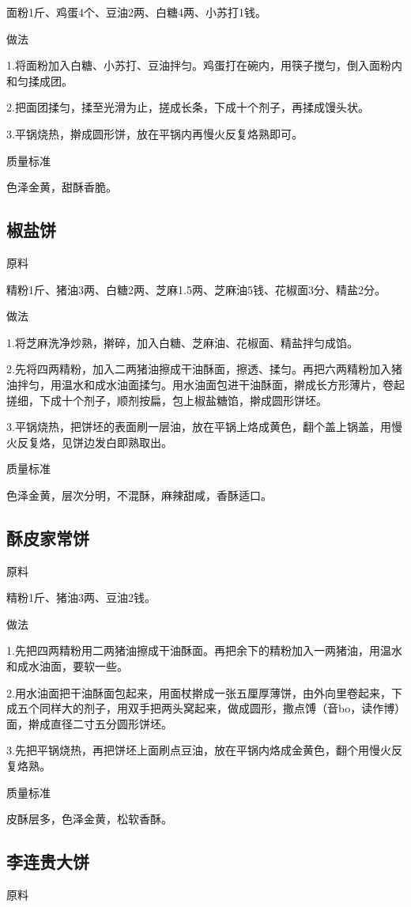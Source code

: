 \documentclass{ctexbook}
\begin{document}
面粉1斤、鸡蛋4个、豆油2两、白糖4两、小苏打1钱。

做法

1.将面粉加入白糖、小苏打、豆油拌匀。鸡蛋打在碗内，用筷子搅匀，倒入面粉内和匀揉成团。

2.把面团揉匀，揉至光滑为止，搓成长条，下成十个剂子，再揉成馒头状。

3.平锅烧热，擀成圆形饼，放在平锅内再慢火反复烙熟即可。

质量标准

色泽金黄，甜酥香脆。
\subsection{椒盐饼}
原料

精粉1斤、猪油3两、白糖2两、芝麻1.5两、芝麻油5钱、花椒面3分、精盐2分。

做法

1.将芝麻洗净炒熟，擀碎，加入白糖、芝麻油、花椒面、精盐拌匀成馅。

2.先将四两精粉，加入二两猪油擦成干油酥面，擦透、揉匀。再把六两精粉加入猪油拌匀，用温水和成水油面揉匀。用水油面包进干油酥面，擀成长方形薄片，卷起搓细，下成十个剂子，顺剂按扁，包上椒盐糖馅，擀成圆形饼坯。

3.平锅烧热，把饼坯的表面刷一层油，放在平锅上烙成黄色，翻个盖上锅盖，用慢火反复烙，见饼边发白即熟取出。

质量标准

色泽金黄，层次分明，不混酥，麻辣甜咸，香酥适口。
\subsection{酥皮家常饼}
原料

精粉1斤、猪油3两、豆油2钱。

做法

1.先把四两精粉用二两猪油擦成干油酥面。再把余下的精粉加入一两猪油，用温水和成水油面，要软一些。

2.用水油面把干油酥面包起来，用面杖擀成一张五厘厚薄饼，由外向里卷起来，下成五个同样大的剂子，用双手把两头窝起来，做成圆形，撒点馎（音bo，读作博）面，擀成直径二寸五分圆形饼坯。

3.先把平锅烧热，再把饼坯上面刷点豆油，放在平锅内烙成金黄色，翻个用慢火反复烙熟。

质量标准

皮酥层多，色泽金黄，松软香酥。
\subsection{李连贵大饼}
原料
\end{document}
